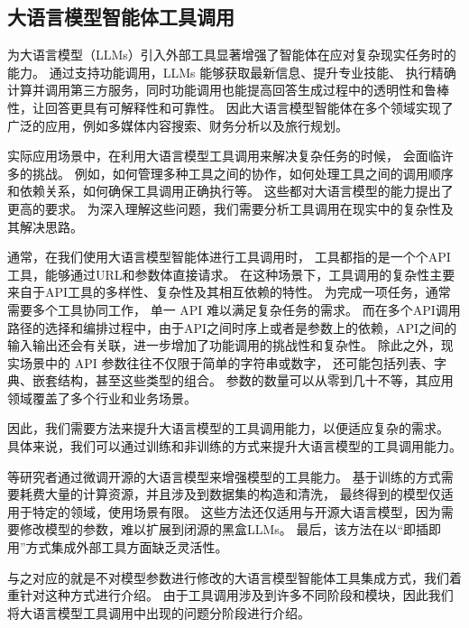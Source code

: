 \subsection{大语言模型智能体工具调用}

为大语言模型（LLMs）引入外部工具显著增强了智能体在应对复杂现实任务时的能力\cite{huang2024planning, Qin2023, qu2024tool}。
通过支持功能调用，LLMs 能够获取最新信息、提升专业技能、
执行精确计算并调用第三方服务，同时功能调用也能提高回答生成过程中的透明性和鲁棒性，让回答更具有可解释性和可靠性。
因此大语言模型智能体在多个领域实现了广泛的应用，例如多媒体内容搜索\cite{Song2023}、财务分析\cite{theuma2024equipping}以及旅行规划\cite{hao2024large}。

实际应用场景中，在利用大语言模型工具调用来解决复杂任务的时候，
会面临许多的挑战。
例如，如何管理多种工具之间的协作，如何处理工具之间的调用顺序和依赖关系，如何确保工具调用正确执行等。
这些都对大语言模型的能力提出了更高的要求\cite{huang2024planning, Qin2023}。
为深入理解这些问题，我们需要分析工具调用在现实中的复杂性及其解决思路。

通常，在我们使用大语言模型智能体进行工具调用时，
工具都指的是一个个API工具，能够通过URL和参数体直接请求。
在这种场景下，工具调用的复杂性主要来自于API工具的多样性、复杂性及其相互依赖的特性\cite{Qin2023}。
为完成一项任务，通常需要多个工具协同工作，
单一 API 难以满足复杂任务的需求\cite{huang2024planning}。
而在多个API调用路径的选择和编排过程中，由于API之间时序上或者是参数上的依赖，API之间的输入输出还会有关联，进一步增加了功能调用的挑战性和复杂性。
除此之外，现实场景中的 API 参数往往不仅限于简单的字符串或数字，
还可能包括列表、字典、嵌套结构，甚至这些类型的组合。
参数的数量可以从零到几十不等，其应用领域覆盖了多个行业和业务场景\cite{ye2024tooleyes}。


因此，我们需要方法来提升大语言模型的工具调用能力，以便适应复杂的需求。
具体来说，我们可以通过训练和非训练的方式来提升大语言模型的工具调用能力。



\cite{Qin2023, schick2024toolformer, hao2024toolkengpt, parisi2022talm}等研究者通过微调开源的大语言模型来增强模型的工具能力。
基于训练的方式需要耗费大量的计算资源，并且涉及到数据集的构造和清洗，
最终得到的模型仅适用于特定的领域，使用场景有限。
这些方法还仅适用与开源大语言模型，因为需要修改模型的参数，难以扩展到闭源的黑盒LLMs。
最后，该方法在以“即插即用”方式集成外部工具方面缺乏灵活性。

与之对应的就是不对模型参数进行修改的大语言模型智能体工具集成方式，我们着重针对这种方式进行介绍。
由于工具调用涉及到许多不同阶段和模块，因此我们将大语言模型工具调用中出现的问题分阶段进行介绍。

